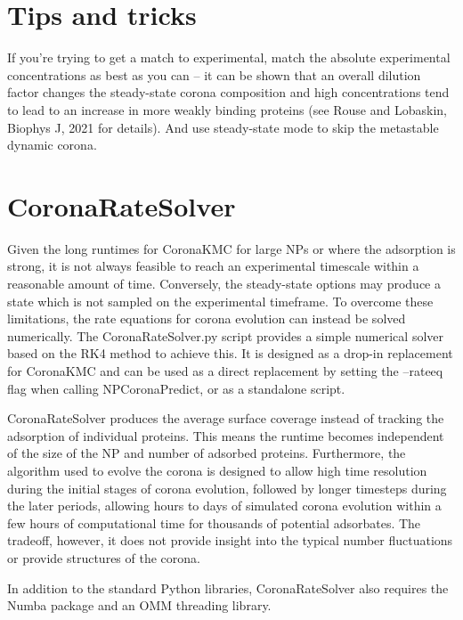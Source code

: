 \documentclass[10pt,a4paper,onecolumn]{report}
\begin{document}
\section{Tips and tricks}
If you're trying to get a match to experimental, match the absolute experimental concentrations as best as you can -- it can be shown that an overall dilution factor changes the steady-state corona composition and high concentrations tend to lead to an increase in more weakly binding proteins (see Rouse and Lobaskin, Biophys J, 2021 for details).  And use steady-state mode to skip the metastable dynamic corona.
 
\section{CoronaRateSolver}
Given the long runtimes for CoronaKMC for large NPs or where the adsorption is strong, it is not always feasible to reach an experimental timescale within a reasonable amount of time. Conversely, the steady-state options may produce a state which is not sampled on the experimental timeframe.
To overcome these limitations, the rate equations for corona evolution can instead be solved numerically. The CoronaRateSolver.py script provides a simple numerical solver based on the RK4 method to achieve this. It is designed as a drop-in replacement for CoronaKMC and can be used as a direct replacement by setting the --rateeq flag when calling NPCoronaPredict, or as a standalone script.

CoronaRateSolver produces the average surface coverage instead of tracking the adsorption of individual proteins. This means the runtime becomes independent of the size of the NP and number of adsorbed proteins. Furthermore, the algorithm used to evolve the corona is designed to allow high time resolution during the initial stages of corona evolution, followed by longer timesteps during the later periods, allowing hours to days of simulated corona evolution within a few hours of computational time for thousands of potential adsorbates. The tradeoff, however, it does not provide insight into the typical number fluctuations or provide structures of the corona.

In addition to the standard Python libraries, CoronaRateSolver also requires the Numba package and an OMM threading library. 
\end{document}
